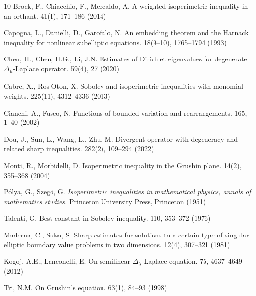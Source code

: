 \documentclass[10pt, reqno]{amsart}
\begin{document}
\begin{thebibliography}{10}
		{\sc Brock, F., Chiacchio, F., Mercaldo, A.}
		\newblock A weighted isoperimetric inequality in an orthant.
		 41(1), 171–186 (2014)
		
		{\sc Capogna, L., Danielli, D., Garofalo, N.}
		\newblock An embedding theorem and the Harnack inequality for nonlinear subelliptic equations.
		 18(9–10), 1765–1794 (1993)
		
		{\sc Chen, H., Chen, H.G., Li, J.N.}
		\newblock Estimates of Dirichlet eigenvalues for degenerate $\Delta_\mu$-Laplace operator. 
		 59(4), 27 (2020)
		
		{\sc Cabre, X., Ros-Oton, X.}
		\newblock Sobolev and isoperimetric inequalities with monomial weights.
		 225(11), 4312–4336 (2013) 
		
		{\sc Cianchi, A., Fusco, N.}
		\newblock Functions of bounded variation and rearrangements.
		 165, 1–40 (2002)
		
		{\sc Dou, J., Sun, L., Wang, L., Zhu, M.}
		\newblock Divergent operator with degeneracy and related sharp inequalities.
		 282(2), 109–294 (2022)
		
		{\sc Monti, R., Morbidelli, D.}
		\newblock Isoperimetric inequality in the Grushin plane.
		 14(2), 355–368 (2004)
		
		{\sc P\'olya, G., Szeg\"o, G.}
		{\it Isoperimetric inequalities in mathematical physics, annals of mathematics studies.} Princeton University Press, Princeton (1951)
		
		{\sc Talenti, G.}
		\newblock Best constant in Sobolev inequality. 
		 110, 353–372 (1976)
		
		{\sc Maderna, C., Salsa, S.}
		\newblock Sharp estimates for solutions to a certain type of singular elliptic boundary value problems in two dimensions.
		 12(4), 307–321 (1981)
		
		{\sc Kogoj, A.E., Lanconelli, E.}
		\newblock On semilinear $\Delta_\lambda$-Laplace equation.
		 75, 4637–4649 (2012)
		
		
		{\sc Tri, N.M.}
		\newblock On Grushin’s equation.
		  63(1), 84–93 (1998)
		

\end{thebibliography}
\end{document}
